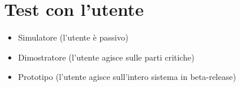 \documentclass[a4paper,12pt]{report}
\begin{document}
	\section{Test con l'utente}
	\begin{itemize}
		\item Simulatore (l'utente è passivo)
		\item Dimostratore (l'utente agisce sulle parti critiche)
		\item Prototipo (l'utente agisce sull'intero sistema in beta-release)
	\end{itemize}
\end{document}
